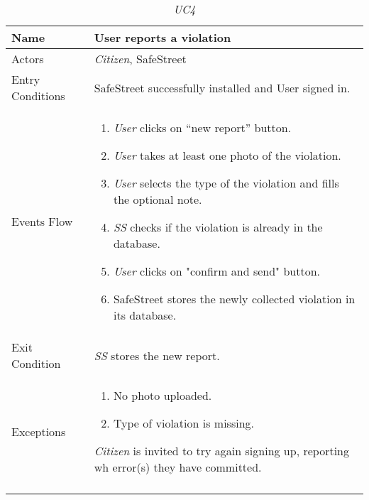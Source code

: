 \documentclass[../../../RASD.tex]{subfiles}
\begin{document}
    \begin{center}
        \begin{longtable}{| p{.35\linewidth} | p{.65\linewidth} |}
            \hline
            \textbf{Name} & \textbf{User reports a violation}\\ \hline
            Actors & \textit{Citizen}, SafeStreet\\ \hline
            Entry Conditions & SafeStreet successfully installed and User signed in.\\ \hline
            Events Flow &
            \begin{enumerate}
                \item \textit{User} clicks on “new report” button.
                \item \textit{User} takes at least one photo of the violation.
                \item \textit{User} selects the type of the violation and fills the optional note.
                \item \textit{SS} checks if the violation is already in the database.
                \item \textit{User} clicks on "confirm and send" button.
                \item SafeStreet stores the newly collected violation in its database.
            \end{enumerate}
            \\ \hline
            Exit Condition & \textit{SS} stores the new report.\\ \hline
            Exceptions &
            \begin{enumerate}
                \item No photo uploaded.
                \item Type of violation is missing.
            \end{enumerate}
            \textit{Citizen} is invited to try again signing up, reporting wh error(s) they have committed. \\
            \hline
            \caption{\textit{UC4}}
        \end{longtable}
    \end{center}
    \newpage
\end{document}
